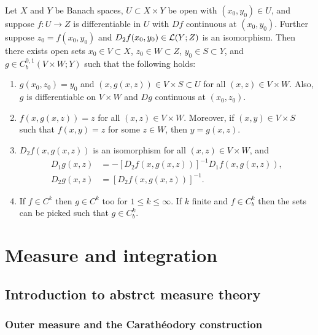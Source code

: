 \documentclass[a4paper]{article}
\begin{document}
\begin{thm}
  Let $X$ and $Y$ be Banach spaces, $U \subset X \times Y$
  be open with $(x_0, y_0) \in U$, and suppose $f: U \to Z$
  is differentiable in $U$ with $Df$ continuous 
  at $(x_0, y_0)$. Further suppose $z_0 = f(x_0, y_0)$
  and $D_2 f(x_0, y_0) \in \mathcal{L}(Y; Z)$ is an isomorphism. 
  Then there exists open sets $x_0 \in V \subset X$, 
  $z_0 \in W \subset Z$, $y_0 \in S \subset Y$, and 
  $g \in C^{0,1}_b (V \times W ; Y)$ such that the following 
  holds:
  \begin{enumerate}
    \item $g(x_0, z_0) = y_0$ and $(x, g(x, z)) \in V \times S 
    \subset U$ for all $(x, z) \in V \times W$. Also, $g$ 
    is differentiable on $V \times W$ and $Dg$ continuous at 
    $(x_0, z_0)$.

    \item $f(x, g(x, z)) = z$ for all $(x, z) \in V \times W$.
    Moreover, if $(x, y) \in V \times S$ such that 
    $f(x, y) = z$ for some $z \in W$, then $y = g(x, z)$.

    \item $D_2 f(x, g(x, z))$ is an isomorphism for all 
    $(x, z) \in V \times W$, and 
    \[
    \begin{aligned}
      D_1 g(x, z) &= - \left[ D_2 f(x, g(x, z)) \right]^{-1} 
      D_1 f (x, g(x, z)), \\
      D_2 g(x, z) &= \left[ D_2 f(x, g(x, z)) \right]^{-1}.
    \end{aligned}
    \]

    \item If $f \in C^k$ then $g \in C^k$ too for $1 \leq k 
    \leq \infty$. If $k$ finite and $f \in C^k_b$ then the 
    sets can be picked such that $g \in C^k_b$.
  \end{enumerate}
\end{thm}


\section{Measure and integration}

\subsection{Introduction to abstrct measure theory}

\subsubsection{Outer measure and the Carath\'eodory construction}
\end{document}
